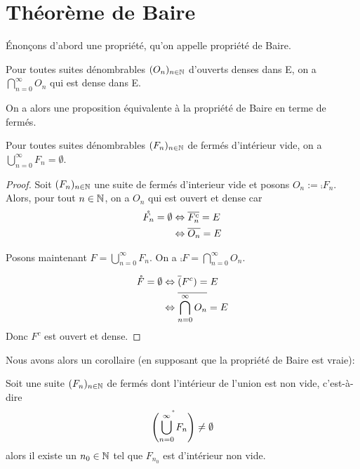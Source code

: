 \chapter{Théorème de Baire}
\label{chapter_baire_theorem}

Énonçons d'abord une propriété, qu'on appelle propriété de Baire.

\begin{propriete} 
	\label{property_baire_open}
	Pour toutes suites dénombrables $(O_{n})_{n \in \mathbb{N}}$ d'ouverts denses dans E, on a $\displaystyle
	\bigcap_{n = 0}^{\infty} O_{n}$ qui est dense dans E.
\end{propriete}

On a alors une proposition équivalente à la propriété de Baire en terme de
fermés.

\begin{propriete} 
\label{property_baire_closed}
Pour toutes suites dénombrables $(F_{n})_{n \in \mathbb{N}}$ de fermés d'intérieur vide, on a
	$\displaystyle \bigcup_{n = 0}^{\infty} F_{n} = \emptyset$.
\end{propriete}

\ifdefined\outputproof
\begin{proof}
	Soit $(F_{n})_{n \in \mathbb{N}}$ une suite de fermés d'interieur vide et
	posons $O_{n} := \comp{F_{n}}$. Alors, pour tout $n \in \mathbb{N}$, on a
	$O_{n}$ qui est ouvert et dense car
	\begin{align}
		\mathring{F_{n}} = \emptyset &\Leftrightarrow \overline{F_{n}^{c}} = E \\
		& \Leftrightarrow \overline{O_{n}} = E
	\end{align}

	Posons maintenant $F = \bigcup_{n = 0}^{\infty} F_{n}$. On a $\comp{F} = \bigcap_{n = 0}^{\infty} O_{n}$.

	\begin{align}
		\mathring{F} = \emptyset & \Leftrightarrow \overline(F^{c}) = E \\
		& \Leftrightarrow \overline{\bigcap_{n = 0}^{\infty} O_{n}} = E
	\end{align}
	Donc $F^{c}$ est ouvert et dense.
\end{proof}
\fi

Nous avons alors un corollaire (en supposant que la propriété de Baire est
vraie):

\begin{corollary}
\label{corollary_baire_int_non_empty}
	Soit une suite $(F_{n})_{n \in \mathbb{N}}$ de fermés dont l'intérieur de
	l'union est non vide, c'est-à-dire 
	\begin{equation}
		\mathring{\left(\bigcup_{n = 0}^{\infty}{F_{n}}\right)} \neq \emptyset
	\end{equation}
	alors il existe un $n_{0} \in \mathbb{N}$ tel que $F_{n_{0}}$
	est d'intérieur non vide.
\end{corollary}

